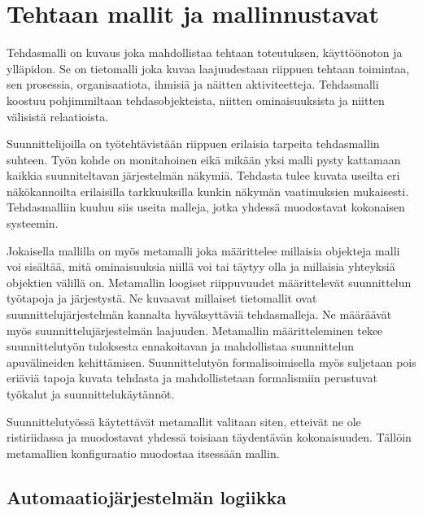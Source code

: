 \documentclass[finnish,12pt]{article}
\begin{document}
	\clearpage
	\section{Tehtaan mallit ja mallinnustavat}

Tehdasmalli on kuvaus joka mahdollistaa tehtaan toteutuksen, käyttöönoton ja
ylläpidon. Se on tietomalli joka kuvaa laajuudestaan riippuen tehtaan toimintaa,
sen prosessia, organisaatiota, ihmisiä ja näitten aktiviteetteja. Tehdasmalli
koostuu pohjimmiltaan tehdasobjekteista, niitten ominaisuuksista ja niitten
välisistä relaatioista. \cite{RefWorks:41}

Suunnittelijoilla on työtehtävistään riippuen erilaisia tarpeita tehdasmallin
suhteen. Työn kohde on monitahoinen eikä mikään yksi malli pysty kattamaan
kaikkia suunniteltavan järjestelmän näkymiä. Tehdasta tulee kuvata useilta eri
näkökannoilta erilaisilla tarkkuuksilla kunkin näkymän vaatimuksien mukaisesti.
Tehdasmalliin kuuluu siis useita malleja, jotka yhdessä muodostavat kokonaisen
systeemin.

Jokaisella mallilla on myös metamalli joka määrittelee millaisia objekteja malli
voi sisältää, mitä ominaisuuksia niillä voi tai täytyy olla ja millaisia
yhteyksiä objektien välillä on. Metamallin loogiset riippuvuudet määrittelevät
suunnittelun työtapoja ja järjestystä. Ne kuvaavat millaiset tietomallit ovat
suunnittelujärjestelmän kannalta hyväksyttäviä tehdasmalleja. Ne määräävät myös
suunnittelujärjestelmän laajuuden. Metamallin määritteleminen tekee
suunnittelutyön tuloksesta ennakoitavan ja mahdollistaa suunnittelun
apuvälineiden kehittämisen. Suunnittelutyön formalisoimisella myös suljetaan
pois eriäviä tapoja kuvata tehdasta ja mahdollistetaan formalismiin perustuvat
työkalut ja suunnittelukäytännöt. 

Suunnittelutyössä käytettävät metamallit valitaan siten, etteivät ne ole
ristiriidassa ja muodostavat yhdessä toisiaan täydentävän kokonaisuuden. Tällöin
metamallien konfiguraatio muodostaa itsessään mallin.

	\subsection{Automaatiojärjestelmän logiikka}
\end{document}
